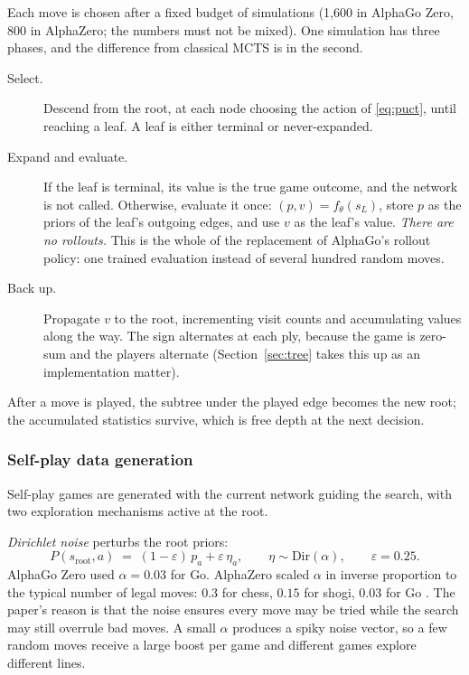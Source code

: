 Each move is chosen after a fixed budget of simulations (1{,}600 in AlphaGo Zero,
800 in AlphaZero; the numbers must not be mixed). One simulation has three
phases, and the difference from classical MCTS is in the second.

\begin{description}
  \item[Select.] Descend from the root, at each node choosing the action of
        \eqref{eq:puct}, until reaching a leaf. A leaf is either terminal or
        never-expanded.
  \item[Expand and evaluate.] If the leaf is terminal, its value is the true game
        outcome, and the network is not called. Otherwise, evaluate it once:
        $(p,v) = f_\theta(s_L)$, store $p$ as the priors of the leaf's outgoing
        edges, and use $v$ as the leaf's value. \emph{There are no rollouts.}
        This is the whole of the replacement of AlphaGo's rollout policy: one
        trained evaluation instead of several hundred random moves.
  \item[Back up.] Propagate $v$ to the root, incrementing visit counts and
        accumulating values along the way. The sign alternates at each ply,
        because the game is zero-sum and the players alternate
        (Section~\ref{sec:tree} takes this up as an implementation matter).
\end{description}

After a move is played, the subtree under the played edge becomes the new root;
the accumulated statistics survive, which is free depth at the next decision.

\subsubsection{Self-play data generation}

Self-play games are generated with the current network guiding the search, with
two exploration mechanisms active at the root.

\emph{Dirichlet noise} perturbs the root priors:
\begin{equation}
P(s_{\mathrm{root}}, a) \;=\; (1-\varepsilon)\, p_a + \varepsilon\, \eta_a,
\qquad \eta \sim \mathrm{Dir}(\alpha), \qquad \varepsilon = 0.25 .
\label{eq:dirichlet}
\end{equation}
AlphaGo Zero used $\alpha = 0.03$ for Go. AlphaZero scaled $\alpha$ in inverse
proportion to the typical number of legal moves: $0.3$ for chess, $0.15$ for
shogi, $0.03$ for Go \citep{silver2018alphazero}. The paper's reason is that the
noise ensures every move may be tried while the search may still overrule bad
moves. A small $\alpha$ produces a spiky noise vector, so a few random moves
receive a large boost per game and different games explore different lines.

